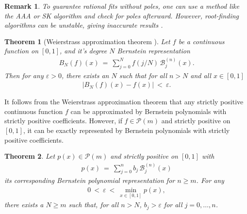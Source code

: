 \documentclass{article}
\newtheorem{theorem}{Theorem}
\newtheorem{remark}{Remark}
\begin{document}
\begin{remark}
To guarantee rational fits without poles, one can use a method like the AAA or SK algorithm and check for poles afterward. However, root-finding algorithms can be unstable, giving inaccurate results \cite{numeric_polynomial_roots_unstable, poles_who_cares}.
\end{remark}

{
\begin{theorem}[Weierstrass approximation theorem \cite{weierstrass_theorem_proof}]
    Let $f$ be a continuous function on $[0,1]$, and it's degree $N$ Bernstein representation
    \begin{eqnarray}
        B_N(f)(x)\ =\ \sum_{j=0}^N f(j/N)\, \mathcal{B}_j^{(n)}(x).
    \end{eqnarray}
    Then for any $\varepsilon>0$, there exists an $N$ such that for all $n>N$ and all $x\in[0,1]$
    \begin{eqnarray}
        |B_N(f)(x) - f(x)|\ <\ \varepsilon.
    \end{eqnarray}
\end{theorem}
It follows from the Weierstrass approximation theorem that any strictly positive continuous function $f$ can be approximated by Bernstein polynomials with strictly positive coefficients. However, if $f\in\mathcal{P}(m)$ and strictly positive on $[0,1]$, it can be exactly represented by Bernstein polynomials with strictly positive coefficients. }

{
\begin{theorem}\label{theorem:polynomial_in_bernstein}
    Let $p(x)\in\mathcal{P}(m)$ and strictly positive on $[0,1]$ with
    \begin{eqnarray}
        p(x)\ =\ \sum_{j=0}^n b_j\, \mathcal{B}_j^{(n)}(x)
    \end{eqnarray}
    its corresponding Bernstein polynomial representation for $n\geq m$. For any 
    \begin{eqnarray}
        0\ <\ \varepsilon\ <\ \min_{x\in[0,1]}p(x),
    \end{eqnarray}
    there exists a $N\geq m$ such that, for all $n>N$, $b_j>\varepsilon$ for all $j=0,\ldots, n$.
\end{theorem}
}
\end{document}
